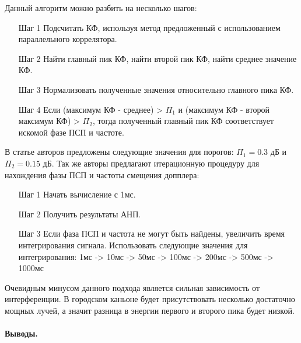 Данный алгоритм можно разбить на несколько шагов:
\begin{itemize}
\item[Шаг 1] Подсчитать КФ, используя метод предложенный с использованием параллельного коррелятора. 
\item[Шаг 2] Найти главный пик КФ, найти второй пик КФ, найти среднее значение КФ.
\item[Шаг 3] Нормализовать полученные значения относительно главного пика КФ.
\item[Шаг 4] Если (максимум КФ - среднее) > ${\Pi_1}$ и (максимум КФ - 
	второй максимум КФ) > ${\Pi_2}$, тогда полученный главный пик КФ соответствует
	искомой фазе ПСП и частоте.
\end{itemize}

В статье авторов \cite{2max_ieee} предложены следующие значения для порогов:
${\Pi_1} = 0.3$ дБ и  ${\Pi_2} = 0.15$ дБ. Так же авторы предлагают итерационную процедуру для нахождения
фазы ПСП и частоты смещения допплера:
\begin{itemize}
\item[Шаг 1] Начать вычисление с 1мс.
\item[Шаг 2] Получить результаты АНП.
\item[Шаг 3] Если фаза ПСП и частота не могут быть найдены, увеличить время интегрирования сигнала.
	Использовать следующие значения для интегрирования: 1мс -> 10мс -> 50мс -> 100мс -> 200мс ->
	500мс -> 1000мс
\end{itemize}

Очевидным минусом данного подхода является сильная зависимость от интерференции. В городском каньоне будет присутствовать
несколько достаточно мощных лучей, а значит разница в энергии первого и второго пика будет низкой.

\paragraph{Выводы.}

\newpage
